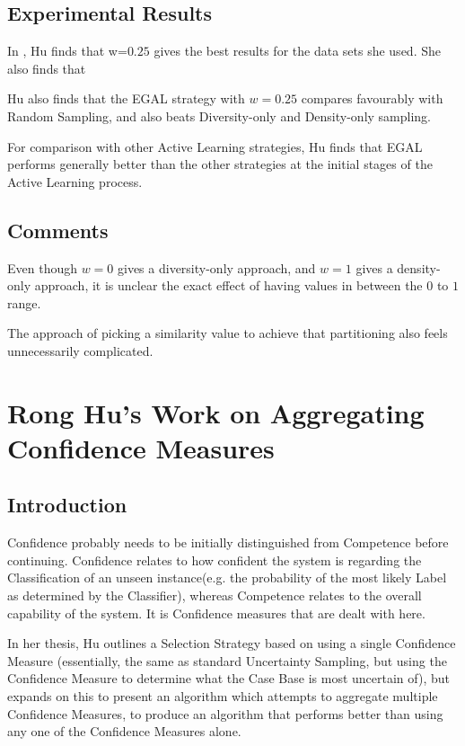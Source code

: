 \documentclass[a4paper,11pt]{report}
\begin{document}
\subsection{Experimental Results}
In \citet{Hu2011}, Hu finds that w=$0.25$ gives the best results for the data sets she used. She also finds that 

Hu also finds that the EGAL strategy with $w=0.25$ compares favourably with Random Sampling, and also beats Diversity-only and Density-only sampling.

For comparison with other Active Learning strategies, Hu finds that EGAL performs generally better than the other strategies at the initial stages of the Active Learning process.

\subsection{Comments}
Even though $w=0$ gives a diversity-only approach, and $w=1$ gives a density-only approach, it is unclear the exact effect of having values in between the $0$ to $1$ range.

The approach of picking a similarity value to achieve that partitioning also feels unnecessarily complicated.

\section{Rong Hu's Work on Aggregating Confidence Measures}
\subsection{Introduction}
Confidence probably needs to be initially distinguished from Competence before continuing. Confidence relates to how confident the system is regarding the Classification of an unseen instance(e.g. the probability of the most likely Label as determined by the Classifier), whereas Competence relates to the overall capability of the system. It is Confidence measures that are dealt with here.

In her thesis\cite{Hu2011}, Hu outlines a Selection Strategy based on using a single Confidence Measure (essentially, the same as standard Uncertainty Sampling, but using the Confidence Measure to determine what the Case Base is most uncertain of), but expands on this to present an algorithm which attempts to aggregate multiple Confidence Measures, to produce an algorithm that performs better than using any one of the Confidence Measures alone.
\end{document}
